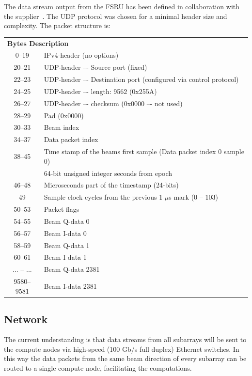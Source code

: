 \documentclass[12pt,a4paper]{article}
\begin{document}
The data stream output from the FSRU has been defined in collaboration with the supplier~\cite{da-design}. 
The UDP protocol was chosen for a minimal header size and complexity.  
The packet structure is:
\begin{center}
\begin{tabular}{cl}
\multicolumn{2}{l}{\textbf{Bytes Description}} \\
                0--19 	& IPv4-header (no options) \\
                20--21 	& UDP-header –- Source port (fixed) \\
                22--23 	& UDP-header –- Destination port (configured via control protocol) \\
                24--25 	& UDP-header –- length: 9562 (0x255A) \\
                26--27 	& UDP-header –- checksum (0x0000 –- not used) \\
                28--29 	& Pad (0x0000) \\
                30--33 	& Beam index \\
                34--37 	& Data packet index \\
                38--45 	& Time stamp of the beams first sample (Data packet index 0 sample 0) \\
                        & 64-bit unsigned integer seconds from epoch \\ %
                46--48  & 	Microseconds part of the timestamp (24-bits) \\
                49 	 & Sample clock cycles from the previous 1 $\mu$s  mark (0 – 103) \\
                50--53 &	Packet flags  \\
                54--55 &	Beam Q-data 0 \\
                56--57 &	Beam I-data 0 \\
                58--59 &	Beam Q-data 1 \\
                60--61 &	Beam I-data 1 \\
                ... -- ... &	Beam Q-data 2381 \\
                9580--9581 &	Beam I-data 2381 \\
\end{tabular}
\end{center} 

\subsection{Network}
The current understanding is that data streams from all subarrays will be sent to the compute nodes via high-speed (100 Gb/s full duplex) Ethernet switches. In this way the data packets from the same beam direction of every subarray can be routed to a single compute node, facilitating the computations. 
                
\end{document}

